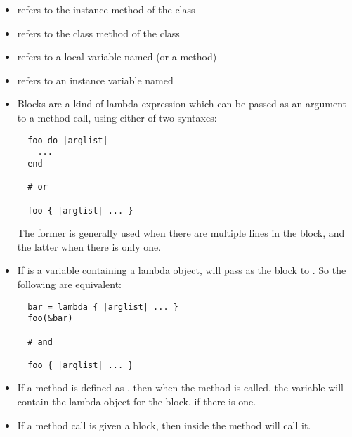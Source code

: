 \begin{itemize}
  \item {} refers to the instance method  of the class 
  
  \item {} refers to the class method  of the class 
  
  \item {} refers to a local variable named  (or a method)
  
  \item {} refers to an instance variable named 
  
  \item Blocks are a kind of lambda expression which can be passed as an argument to a method call, using either of two syntaxes:
  \begin{lstlisting}
  foo do |arglist|
    ...
  end
  
  # or
  
  foo { |arglist| ... }
  \end{lstlisting}
  
  The former is generally used when there are multiple lines in the block, and the latter when there is only one.
  
  \item If  is a variable containing a lambda object,  will pass  as the block to . So the following are equivalent:
  \begin{lstlisting}
  bar = lambda { |arglist| ... }
  foo(&bar)
  
  # and
  
  foo { |arglist| ... }
  \end{lstlisting}
  
  \item If a method is defined as , then when the method is called, the  variable will contain the lambda object for the block, if there is one.
  
  \item If a method call is given a block, then  inside the method will call it.
\end{itemize}
